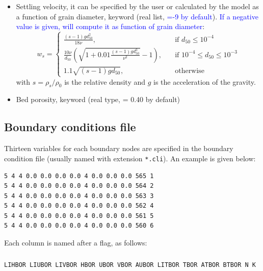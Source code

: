 {\begin{itemize}
\item Settling velocity, it can be specified by the user or calculated by the model as a function of grain diameter, keyword  (real list, \textcolor{blue}{=-9 by default}). \textcolor{blue}{If a negative value is given, \gaia{} will compute it as function of grain diameter}:
  \begin{equation*}
w_{s} = \left\{\begin{array}{ll}
\displaystyle
\frac{(s-1)g d_{50}^2}{18\nu}, & \quad \text{if } d_{50} \leq 10^{-4} \\
\displaystyle
\frac{10\nu}{d_{50}} \left(\sqrt{1+0.01\frac{(s-1)gd_{50}^3}{\nu^2}}-1\right), & \quad \text{if } 10^{-4} \leq d_{50} \leq 10^{-3}\\
\displaystyle
1.1 \sqrt{(s-1)gd_{50}}, & \quad \text{otherwise}
\end{array}
\right.
\end{equation*}
with $s=\rho_{s}/\rho_0$ is the relative density and $g$ is the acceleration of the gravity.%
\item Bed porosity, keyword  (real type, {\ttfamily = 0.40} by default)
\end{itemize}



\subsection{Boundary conditions file}\label{sec:flags}
Thirteen variables for each boundary nodes are specified in the boundary condition file (usually named with extension \texttt{*.cli}). An example is given below:

\begin{lstlisting}[frame=trBL]
5 4 4 0.0 0.0 0.0 0.0 4 0.0 0.0 0.0 565 1
5 4 4 0.0 0.0 0.0 0.0 4 0.0 0.0 0.0 564 2
5 4 4 0.0 0.0 0.0 0.0 4 0.0 0.0 0.0 563 3
5 4 4 0.0 0.0 0.0 0.0 4 0.0 0.0 0.0 562 4
5 4 4 0.0 0.0 0.0 0.0 4 0.0 0.0 0.0 561 5
5 4 4 0.0 0.0 0.0 0.0 4 0.0 0.0 0.0 560 6
\end{lstlisting}

Each column is named after a flag, as follows:
\subsubsection{}
\begin{lstlisting}[frame=trBL]
LIHBOR LIUBOR LIVBOR HBOR UBOR VBOR AUBOR LITBOR TBOR ATBOR BTBOR N K
\end{lstlisting}
}
